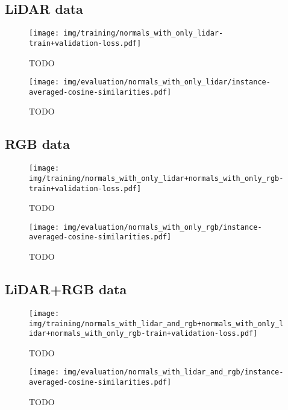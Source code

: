 \subsection{LiDAR data}

\begin{figure}[H]
  \texttt{[image: img/training/normals\_with\_only\_lidar-train+validation-loss.pdf]}
  \caption{TODO}
\end{figure}

\begin{figure}[H]
  \texttt{[image: img/evaluation/normals\_with\_only\_lidar/instance-averaged-cosine-similarities.pdf]}
  \caption{TODO}
\end{figure}

\subsection{RGB data}

\begin{figure}[H]
  \texttt{[image: img/training/normals\_with\_only\_lidar+normals\_with\_only\_rgb-train+validation-loss.pdf]}
  \caption{TODO}
\end{figure}

\begin{figure}[H]
  \texttt{[image: img/evaluation/normals\_with\_only\_rgb/instance-averaged-cosine-similarities.pdf]}
  \caption{TODO}
\end{figure}

\subsection{LiDAR+RGB data}

\begin{figure}[H]
  \texttt{[image: img/training/normals\_with\_lidar\_and\_rgb+normals\_with\_only\_lidar+normals\_with\_only\_rgb-train+validation-loss.pdf]}
  \caption{TODO}
\end{figure}

\begin{figure}[H]
  \texttt{[image: img/evaluation/normals\_with\_lidar\_and\_rgb/instance-averaged-cosine-similarities.pdf]}
  \caption{TODO}
\end{figure}
